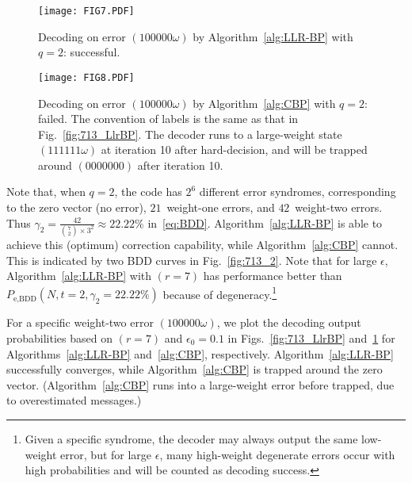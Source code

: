 \documentclass{ieeeaccess}
\theoremstyle{definition}		%
\begin{document}
 
\begin{figure}
	\centering \texttt{[image: FIG7.PDF]}
	\caption{Decoding on error $(1 0 0 0 0 0 \omega)$ by Algorithm~\ref{alg:LLR-BP} with $q=2$: successful.
	} \label{fig:713_LlrBP}	\vspace*{\floatsep}
	\centering \texttt{[image: FIG8.PDF]}
	\caption{Decoding on error $(1 0 0 0 0 0 \omega)$ by Algorithm~\ref{alg:CBP} with $q=2$: failed.
	The convention of labels is the same as that in Fig.~\ref{fig:713_LlrBP}.
	The decoder runs to a large-weight state $(111111\omega)$ at iteration 10 after hard-decision, and will be trapped around $(0000000)$ after iteration 10.
	} \label{fig:713_ClsBP}	%
\end{figure}



Note that, when ${q=2}$, the code has $2^{6}$ different error syndromes, corresponding to the zero vector (no error), \mbox{$21$ weight-one} errors, and \mbox{$42$ weight-two} errors. Thus $\gamma_2 = \frac{42}{{7\choose 2}\times 3^2} \approx 22.22\%$ in~\eqref{eq:BDD}.
Algorithm~\ref{alg:LLR-BP} is able to achieve this (optimum) correction capability, while Algorithm~\ref{alg:CBP} cannot.
This is indicated by two BDD curves in Fig.~\ref{fig:713_2}.
Note that for large $\epsilon$, Algorithm~\ref{alg:LLR-BP} with $(r=7)$ has performance better than $P_\text{e,BDD}(N,t=2,\gamma_2=22.22\%)$ 
because of degeneracy.\footnote{
	Given a specific syndrome, the decoder may always output the same low-weight error, but for large $\epsilon$, many high-weight degenerate errors occur with high probabilities and will be counted as decoding success.}


For a specific weight-two error $(1 0 0 0 0 0 \omega)$, we plot the decoding output probabilities based on $(r=7)$ and $\epsilon_0=0.1$ %
in Figs.~\ref{fig:713_LlrBP} and~\ref{fig:713_ClsBP} for Algorithms~\ref{alg:LLR-BP} and~\ref{alg:CBP}, respectively. 
Algorithm~\ref{alg:LLR-BP} successfully converges, while Algorithm~\ref{alg:CBP} is trapped around the zero vector.
(Algorithm~\ref{alg:CBP} runs into a large-weight error before trapped, due to overestimated messages.)
\end{document}
